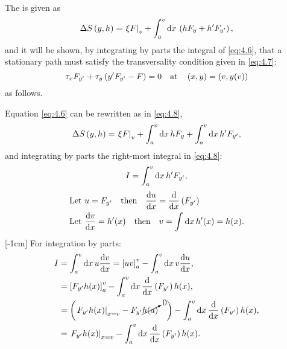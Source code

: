 The \gd is given as
\begin{equation}
	\label{eq:4.6}
	\Delta S\left(y,h\right) = \left. \xi F \right|_v + \int_{a}^{v}\mathrm{d} x\,\left(hF_y + h^\prime F_{y^\prime}\right),
\end{equation}
and it will be shown, by integrating by parts the integral of \eqref{eq:4.6}, that a stationary path  must satisfy the transversality condition given in \eqref{eq:4.7}:
\begin{equation}
	\label{eq:4.7}
	\tau_x F_{y^\prime} + \tau_y\left(y^\prime F_{y^\prime} - F\right) = 0 \quad\text{at}\quad\left(x,y\right) = \left(v,y(v)\right)
\end{equation}
as follows.

Equation \eqref{eq:4.6} can be rewritten as in \eqref{eq:4.8},
\begin{equation}
	\label{eq:4.8}
	\Delta S\left(y,h\right) = \left. \xi F \right|_v + \int_{a}^{v}\mathrm{d} x\, hF_y + \int_{a}^{v}\mathrm{d} x\, h^\prime F_{y^\prime},
\end{equation}
and integrating by parts the right-most integral in \eqref{eq:4.8}:
\begin{equation}
\label{eq:4.9}
\begin{split}
	I = \int_{a}^{v}\mathrm{d} x\, h^\prime F_{y^\prime},
\end{split}
\end{equation}
\begin{equation*}
\begin{split}
	&\text{Let } u=F_{y^\prime}\quad\text{then}\quad \frac{\mathrm{d}u}{\mathrm{d}x} = \frac{\mathrm{d}}{\mathrm{d}x}\left(F_{y^\prime}\right)\\
	&\text{Let } \frac{\mathrm{d}v}{\mathrm{d}x} = h^\prime(x) \quad\text{then}\quad v = \int_{}^{}\mathrm{d} x\, h^\prime(x) = h(x).
\end{split}
\end{equation*}
[-1cm]
For integration by parts:
\begin{equation*}
\begin{split}
	I &= \int_{a}^{v}\mathrm{d} x\, u \frac{\mathrm{d}v}{\mathrm{d}x} = \left[uv\right]_a^v - \int_{a}^{v}\mathrm{d} x\, v \frac{\mathrm{d}u}{\mathrm{d}x},\\
	&= \left[F_{y^\prime} h(x)\right]_a^v - \int_{a}^{v}\mathrm{d} x\,\frac{\mathrm{d}}{\mathrm{d}x}\left(F_{y^\prime}\right) h(x),\\
	&= \left(\left. F_{y^\prime} h(x)\right|_{x=v} - F_{y^\prime} \cancelto{0}{h(a)}\quad\right) - \int_{a}^{v}\mathrm{d} x\,\frac{\mathrm{d}}{\mathrm{d}x}\left(F_{y^\prime}\right) h(x),\\
	&=  \left. F_{y^\prime} h(x)\right|_{x=v}- \int_{a}^{v}\mathrm{d} x\,\frac{\mathrm{d}}{\mathrm{d}x}\left(F_{y^\prime}\right) h(x).
\end{split}
\end{equation*}
